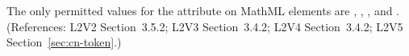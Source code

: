 The only permitted values for the  attribute on MathML
 elements are , , , and
.  (References: L2V2 Section~3.5.2; L2V3 Section~3.4.2; L2V4 Section~3.4.2; L2V5 Section~\ref{sec:cn-token}.)

